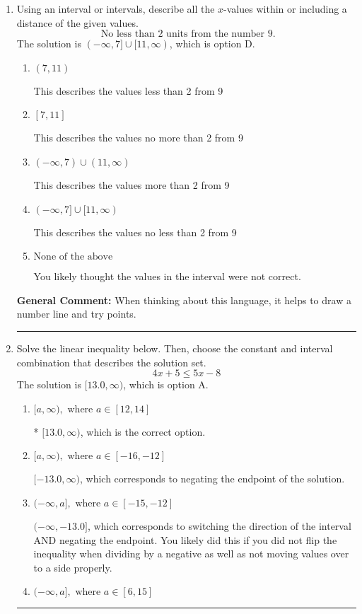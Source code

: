 \documentclass{extbook}[14pt]
\newcommand{\litem}[1]{\item #1

\rule{\textwidth}{0.4pt}}
\begin{document}
\begin{enumerate}\litem{
Using an interval or intervals, describe all the $x$-values within or including a distance of the given values.
\[ \text{ No less than } 2 \text{ units from the number } 9. \]The solution is \( (-\infty, 7] \cup [11, \infty) \), which is option D.\begin{enumerate}[label=\Alph*.]
\item \( (7, 11) \)

This describes the values less than 2 from 9
\item \( [7, 11] \)

This describes the values no more than 2 from 9
\item \( (-\infty, 7) \cup (11, \infty) \)

This describes the values more than 2 from 9
\item \( (-\infty, 7] \cup [11, \infty) \)

This describes the values no less than 2 from 9
\item \( \text{None of the above} \)

You likely thought the values in the interval were not correct.
\end{enumerate}

\textbf{General Comment:} When thinking about this language, it helps to draw a number line and try points.
}
\litem{
Solve the linear inequality below. Then, choose the constant and interval combination that describes the solution set.
\[ 4x + 5 \leq 5x -8 \]The solution is \( [13.0, \infty) \), which is option A.\begin{enumerate}[label=\Alph*.]
\item \( [a, \infty), \text{ where } a \in [12, 14] \)

* $[13.0, \infty)$, which is the correct option.
\item \( [a, \infty), \text{ where } a \in [-16, -12] \)

 $[-13.0, \infty)$, which corresponds to negating the endpoint of the solution.
\item \( (-\infty, a], \text{ where } a \in [-15, -12] \)

 $(-\infty, -13.0]$, which corresponds to switching the direction of the interval AND negating the endpoint. You likely did this if you did not flip the inequality when dividing by a negative as well as not moving values over to a side properly.
\item \( (-\infty, a], \text{ where } a \in [6, 15] \)


\end{enumerate}}
\end{enumerate}
\end{document}
